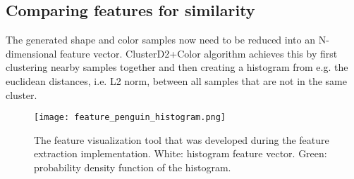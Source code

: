 \subsection{Comparing features for similarity}

The generated shape and color samples now need to be reduced into an N-dimensional feature vector. ClusterD2+Color algorithm achieves this by first clustering nearby samples together and then
creating a histogram from e.g. the euclidean distances, i.e. L2 norm, between all samples that are not in the same cluster.\\

\begin{wrapfigure}{R}{0.3\textwidth}
\texttt{[image: feature\_penguin\_histogram.png]}
\caption{The feature visualization tool that was developed during the feature extraction implementation. White: histogram feature vector. Green: probability density function of the histogram.}
\label{fig:feature_penguin_histogram}
\end{wrapfigure}

